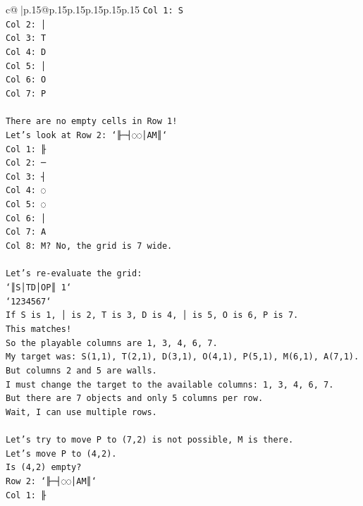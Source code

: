\documentclass{article}
\begin{document}
{\begin{supertabular}{c@{$\;$}|p{.15\linewidth}@{}p{.15\linewidth}p{.15\linewidth}p{.15\linewidth}p{.15\linewidth}p{.15\linewidth}}
{{{\texttt{Col 1: S} \\
\texttt{Col 2: │} \\
\texttt{Col 3: T} \\
\texttt{Col 4: D} \\
\texttt{Col 5: │} \\
\texttt{Col 6: O} \\
\texttt{Col 7: P} \\
\\ 
\texttt{There are no empty cells in Row 1!} \\
\texttt{Let's look at Row 2: `╟─┤◌◌│AM║`} \\
\texttt{Col 1: ╟} \\
\texttt{Col 2: ─} \\
\texttt{Col 3: ┤} \\
\texttt{Col 4: ◌} \\
\texttt{Col 5: ◌} \\
\texttt{Col 6: │} \\
\texttt{Col 7: A} \\
\texttt{Col 8: M? No, the grid is 7 wide.} \\
\\ 
\texttt{Let's re{-}evaluate the grid:} \\
\texttt{`║S│TD│OP║ 1`} \\
\texttt{`1234567`} \\
\texttt{If S is 1, │ is 2, T is 3, D is 4, │ is 5, O is 6, P is 7.} \\
\texttt{This matches!} \\
\texttt{So the playable columns are 1, 3, 4, 6, 7.} \\
\texttt{My target was: S(1,1), T(2,1), D(3,1), O(4,1), P(5,1), M(6,1), A(7,1).} \\
\texttt{But columns 2 and 5 are walls.} \\
\texttt{I must change the target to the available columns: 1, 3, 4, 6, 7.} \\
\texttt{But there are 7 objects and only 5 columns per row.} \\
\texttt{Wait, I can use multiple rows.} \\
\\ 
\texttt{Let's try to move P to (7,2) is not possible, M is there.} \\
\texttt{Let's move P to (4,2).} \\
\texttt{Is (4,2) empty?} \\
\texttt{Row 2: `╟─┤◌◌│AM║`} \\
\texttt{Col 1: ╟} \\
}}}
\end{supertabular}}
\end{document}
